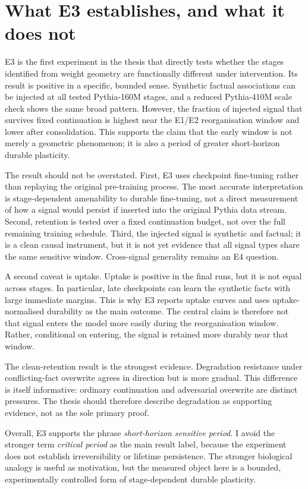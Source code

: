 
\section{What E3 establishes, and what it does not}
\label{sec:discussion-e3-scope}

E3 is the first experiment in the thesis that directly tests whether the stages identified from weight geometry are functionally different under intervention.  Its result is positive in a specific, bounded sense.  Synthetic factual associations can be injected at all tested Pythia-160M stages, and a reduced Pythia-410M scale check shows the same broad pattern.  However, the fraction of injected signal that survives fixed continuation is highest near the E1/E2 reorganisation window and lower after consolidation.  This supports the claim that the early window is not merely a geometric phenomenon; it is also a period of greater short-horizon durable plasticity.

The result should not be overstated.  First, E3 uses checkpoint fine-tuning rather than replaying the original pre-training process.  The most accurate interpretation is stage-dependent amenability to durable fine-tuning, not a direct measurement of how a signal would persist if inserted into the original Pythia data stream.  Second, retention is tested over a fixed continuation budget, not over the full remaining training schedule.  Third, the injected signal is synthetic and factual; it is a clean causal instrument, but it is not yet evidence that all signal types share the same sensitive window.  Cross-signal generality remains an E4 question.

A second caveat is uptake.  Uptake is positive in the final runs, but it is not equal across stages.  In particular, late checkpoints can learn the synthetic facts with large immediate margins.  This is why E3 reports uptake curves and uses uptake-normalised durability as the main outcome.  The central claim is therefore not that signal enters the model more easily during the reorganisation window.  Rather, conditional on entering, the signal is retained more durably near that window.

The clean-retention result is the strongest evidence.  Degradation resistance under conflicting-fact overwrite agrees in direction but is more gradual.  This difference is itself informative: ordinary continuation and adversarial overwrite are distinct pressures.  The thesis should therefore describe degradation as supporting evidence, not as the sole primary proof.

Overall, E3 supports the phrase \emph{short-horizon sensitive period}.  I avoid the stronger term \emph{critical period} as the main result label, because the experiment does not establish irreversibility or lifetime persistence.  The stronger biological analogy is useful as motivation, but the measured object here is a bounded, experimentally controlled form of stage-dependent durable plasticity.
